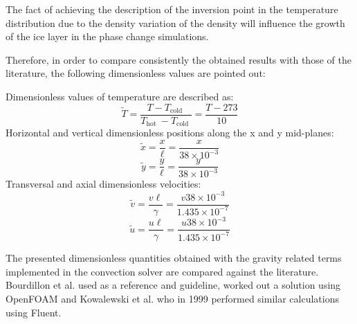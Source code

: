 \noindent The fact of achieving the description of the inversion point in the temperature distribution due to the density variation of the density will influence the growth of the ice layer in the phase change simulations.

\noindent Therefore, in order to compare consistently the obtained results with those of the literature, the following dimensionless values are pointed out:

\noindent Dimensionless values of temperature are described as:
\begin{equation}
	\tilde{T}=\frac{T-T_{\text {cold }}}{T_{\text {hot }}-T_{\text {cold }}}=\frac{T-273}{10}
	\label{3.29}
\end{equation}
Horizontal and vertical dimensionless positions along the x and y mid-planes:
\begin{equation}
	\tilde{x}=\frac{x}{\ell}=\frac{x}{38 \times 10^{-3}}
	\label{3.30}
\end{equation}
\begin{equation}
\tilde{y}=\frac{y}{\ell}=\frac{y}{38 \times 10^{-3}}
\label{3.34}
\end{equation}
Transversal and axial dimensionless velocities:
\begin{equation}
	\tilde{v}=\frac{v \ell}{\gamma}=\frac{v 38 \times 10^{-3}}{1.435 \times 10^{-7}}
	\label{3.31}
\end{equation}
\begin{equation}
	\tilde{u}=\frac{u \ell}{\gamma}=\frac{u 38 \times 10^{-3}}{1.435 \times 10^{-7}}
	\label{3.32}
\end{equation}

\clearpage
\noindent The presented dimensionless quantities obtained with the gravity related terms implemented in the convection solver are compared against the literature. Bourdillon et al. \cite{bourdillon_2016} used as a reference and guideline, worked out a solution using OpenFOAM and Kowalewski et al. \cite{kowalewski_rebow_1999} who in 1999 performed similar calculations using Fluent.

